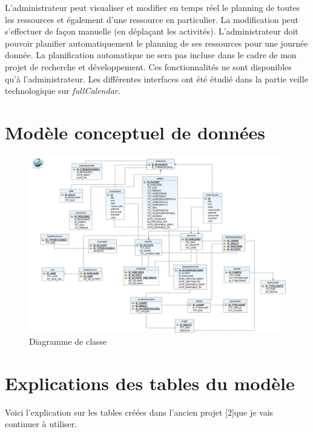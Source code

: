 \documentclass{polytech/polytech}
\begin{document}
L'administrateur peut visualiser et modifier en temps réel le planning de toutes les ressources et également d'une ressource en particulier. La modification peut s'effectuer de façon manuelle (en déplaçant les activités). L'administrateur doit pouvoir planifier automatiquement le planning de ses ressources pour une journée donnée. La planification automatique ne sera pas incluse dans le cadre de mon projet de recherche et développement. Ces fonctionnalités ne sont disponibles qu’à l’administrateur. Les différentes interfaces ont été étudié dans la partie veille technologique sur \textit{fullCalendar}.

\chapter{Modèle conceptuel de données}
\label{ann:modeleBDD}

\begin{figure}
	\includegraphics[scale=0.5]{images/tablesBD}
	\caption{Diagramme de classe}
	\label{fig:modeleBDD}
\end{figure}

\chapter{Explications des tables du modèle}
\label{ann:expModele}


Voici l'explication sur les tables créées dans l'ancien projet [2]que je vais continuer à utiliser.
\end{document}
